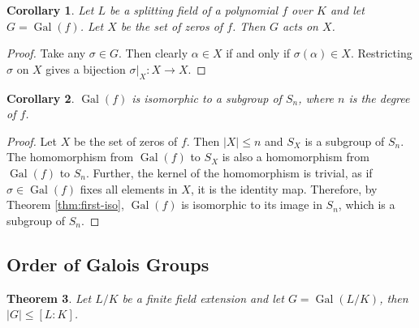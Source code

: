 \documentclass[12pt]{article}
\newtheorem{theorem}{Theorem}
\newtheorem{corollary}[theorem]{Corollary}
\theoremstyle{definition}
\newcommand{\Gal}{\operatorname{Gal}}
\newcommand{\TODO}{\textbf{\textcolor{red}{TODO}}}
\begin{document}
\begin{corollary}
	Let $L$ be a splitting field of a polynomial $f$ over $K$ and let $G = \Gal(f)$. Let $X$ be the set of zeros of $f$. Then $G$ acts on $X$.
\end{corollary}

\begin{proof}
	Take any $\sigma \in G$. Then clearly $\alpha \in X$ if and only if $\sigma(\alpha) \in X$. Restricting $\sigma$ on $X$ gives a bijection $\sigma | _X : X \to X$. 
\end{proof}


\begin{corollary} \label{thm:galois-group-isomorphic-symmetric-subgroup}
	$\Gal(f)$ is isomorphic to a subgroup of $S_n$, where $n$ is the degree of $f$. 
\end{corollary}

\begin{proof}
	Let $X$ be the set of zeros of $f$. Then $|X| \le n$ and $S_X$ is a subgroup of $S_n$. The homomorphism from $\Gal(f)$ to $S_X$ is also a homomorphism from $\Gal(f)$ to $S_n$. Further, the kernel of the homomorphism is trivial, as if $\sigma \in \Gal(f)$ fixes all elements in $X$, it is the identity map. Therefore, by Theorem \ref{thm:first-iso}, $\Gal(f)$ is isomorphic to its image in $S_n$, which is a subgroup of $S_n$. 
\end{proof}






\subsection{Order of Galois Groups}



\begin{theorem} \label{thm:galois-group-order-upper-bound}
    Let $L/K$ be a finite field extension and let $G = \Gal(L/K)$, then $|G| \le [L:K]$. 
\end{theorem}
\end{document}
